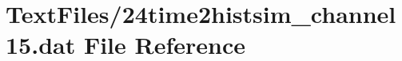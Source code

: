 \hypertarget{24time2histsim__channel15_8dat}{}\section{Text\+Files/24time2histsim\+\_\+channel15.dat File Reference}
\label{24time2histsim__channel15_8dat}
